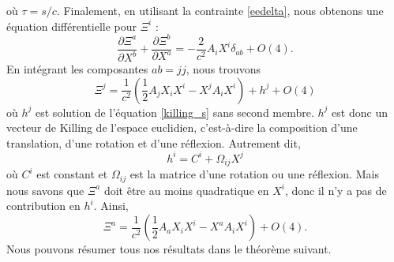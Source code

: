 			où $\tau = s/c$.
			Finalement, en utilisant la contrainte \ref{eedelta}, nous obtenons une équation différentielle pour $\Xi^i$ :
			\begin{equation}
				\frac{\partial \Xi^a}{\partial X^b}+\frac{\partial \Xi^b}{\partial X^a} = -\frac{2}{c^2	} A_i X^i \delta_{ab} + O(4). \label{killing_s}
			\end{equation}
			En intégrant les composantes $ab=jj$, nous trouvons 
			\begin{equation}
				\Xi^j=\frac{1}{c^2} \left( \frac{1}{2} A_j X_iX^i - X^j A_i X^i \right) + h^j + O(4)
			\end{equation}
			où $h^j$ est solution de l'équation \ref{killing_s} sans second membre. $h^j$ est donc un vecteur de Killing de l'espace euclidien, c'est-à-dire la composition d'une translation, d'une rotation et d'une réflexion. Autrement dit, 
			\begin{equation}
				h^i=C^i+\Omega_{ij}X^j
			\end{equation}
			où $C^i$ est constant et $\Omega_{ij}$ est la matrice d'une rotation ou une réflexion. Mais nous savons que $\Xi^a$ doit être au moins quadratique en $X^i$, donc il n'y a pas de contribution en $h^i$. Ainsi, 
			\begin{equation}
				\Xi^a=\frac{1}{c^2} \left( \frac{1}{2} A_a X_iX^i - X^a A_i X^i \right) + O(4). \label{parametrisation_z_e_xi}
			\end{equation}
			Nous pouvons résumer tous nos résultats dans le théorème suivant.

